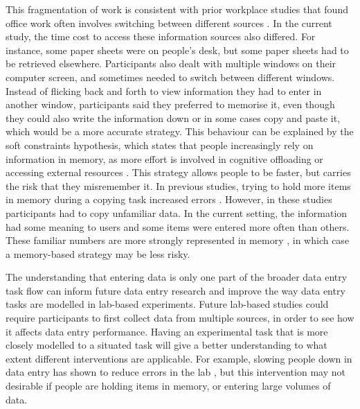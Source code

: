 This fragmentation of work is consistent with prior workplace studies that found  office work often involves switching between different sources \citep{Cangiano2009, Czerwinski2004, Mark2005, Sellberg2014}. In the current study, the time cost to access these information sources also differed. For instance, some paper sheets were on people's desk, but some paper sheets had to be retrieved elsewhere. Participants also dealt with multiple windows on their computer screen, and sometimes needed to switch between different windows. Instead of flicking back and forth to view information they had to enter in another window, participants said they preferred to memorise it, even though they could also write the information down or in some cases copy and paste it, which would be a more accurate strategy. This behaviour can be explained by the soft constraints hypothesis, which states that people increasingly rely on information in memory, as more effort is involved in cognitive offloading or accessing external resources \citep{Gray2006}. This strategy allows people to be faster, but carries the risk that they misremember it. In previous studies, trying to hold more items in memory during a copying task increased errors \citep[e.g.][]{Borghouts2015, Morgan2009}. However, in these studies participants had to copy unfamiliar data. In the current setting, the information had some meaning to users and some items were entered more often than others. These familiar numbers are more strongly represented in memory \citep{Wiseman2014}, in which case a memory-based strategy may be less risky.

The understanding that entering data is only one part of the broader data entry task flow can inform future data entry research and improve the way data entry tasks are modelled in lab-based experiments. Future lab-based studies could require participants to first collect data from multiple sources, in order to see how it affects data entry performance. Having an experimental task that is more closely modelled to a situated task will give a better understanding to what extent different interventions are applicable. For example, slowing people down in data entry has shown to reduce errors in the lab \citep{Gould2016, Wiseman2013b}, but this intervention may not desirable if people are holding items in memory, or entering large volumes of data.

